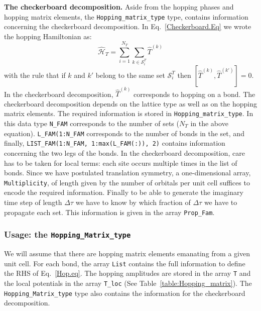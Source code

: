\noindent
\textbf{The checkerboard decomposition.}   Aside from the hopping phases and hopping matrix elements, the \texttt{Hopping\_matrix\_type} type, contains information  concerning the checkerboard   decomposition.  In Eq.~\ref{Checkerboard.Eq} we wrote the hopping Hamiltonian as:
\begin{equation}
	\hat{\mathcal{H}}_{T}     = \sum_{i=1}^{N_T} \sum_{k \in \mathcal{S}^{T}_i} \hat{T}^{(k)}  
\end{equation}
with the rule that  if $k$ and $k'$  belong to the same set $\mathcal{S}^{T}_i $ then   $ \left[ \hat{T}^{(k)} , \hat{T}^{(k')} \right] = 0 $.  In the checkerboard decomposition, $\hat{T}^{(k)}$   corresponds to  hopping on a bond.    The checkerboard decomposition depends on the   lattice type as well as on the hopping matrix elements.   The required  information is stored in  \texttt{Hopping\_matrix\_type}. In this data type  \texttt{N\_FAM}  corresponds to the number of sets  ($N_T$ in the above equation). \texttt{L\_FAM(1:N\_FAM}   corresponds to the number of bonds in the set,  and finally, 
 \texttt{LIST\_FAM(1:N\_FAM, 1:max(L\_FAM(:)), 2)}    contains  information concerning the two legs of the bonds.    In the checkerboard decomposition, care has to be taken for local terms: each site  occurs multiple times in the list of bonds.    Since we have postulated translation symmetry,    a one-dimensional array, \texttt{Multiplicity},  of length  given by  the number of orbitals per unit cell suffices to  encode the required information.  
 Finally to be able to generate  the imaginary time step of length $\Delta \tau$  we  have to know   by which fraction of  $\Delta \tau$   we have to propagate each set.  This information is given in  the array  \texttt{Prop\_Fam}.  
 




\subsubsection{Usage: the  \texttt{Hopping\_Matrix\_type} }
\label{Hopping_Matrix_type.sec} 


We will assume that there are     hopping   matrix  elements  emanating  from  a  given unit  cell. For  each bond,  the array 
\texttt{List}   contains the full  information to define the  RHS of Eq.~\eqref{Hop.eq}.    The hopping amplitudes are  stored in the  array  \texttt{T}  and the local potentials in the  array \texttt{T\_loc}   (See  Table~\ref{table:Hopping_matrix}).    The  \texttt{Hopping\_Matrix\_type}   type    also contains the information for the  checkerboard   decomposition.

